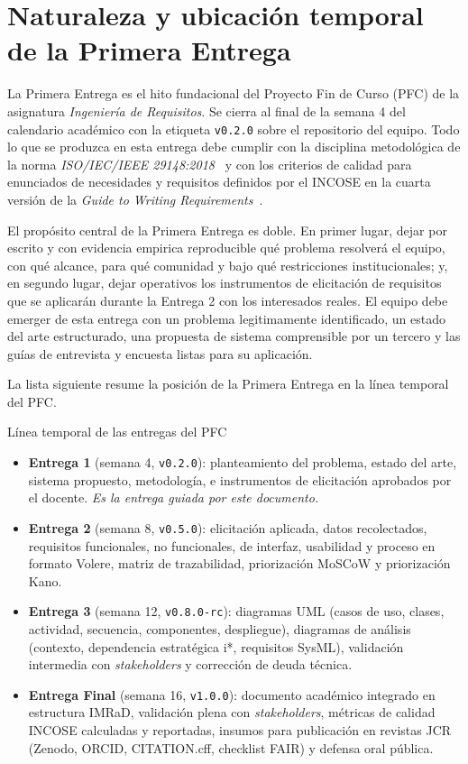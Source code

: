 \documentclass[11pt,a4paper]{article}
\begin{document}
\section{Naturaleza y ubicaci\'on temporal de la Primera Entrega}

La Primera Entrega es el hito fundacional del Proyecto Fin de Curso (PFC) de la asignatura \emph{Ingenier\'ia de Requisitos}. Se cierra al final de la semana 4 del calendario acad\'emico con la etiqueta \texttt{v0.2.0} sobre el repositorio del equipo. Todo lo que se produzca en esta entrega debe cumplir con la disciplina metodol\'ogica de la norma \emph{ISO/IEC/IEEE 29148:2018}~\cite{iso29148} y con los criterios de calidad para enunciados de necesidades y requisitos definidos por el INCOSE en la cuarta versi\'on de la \emph{Guide to Writing Requirements}~\cite{incose2023requirements}.

El prop\'osito central de la Primera Entrega es doble. En primer lugar, dejar por escrito y con evidencia empirica reproducible qu\'e problema resolver\'a el equipo, con qu\'e alcance, para qu\'e comunidad y bajo qu\'e restricciones institucionales; y, en segundo lugar, dejar operativos los instrumentos de elicitaci\'on de requisitos que se aplicar\'an durante la Entrega 2 con los interesados reales. El equipo debe emerger de esta entrega con un problema legitimamente identificado, un estado del arte estructurado, una propuesta de sistema comprensible por un tercero y las gu\'ias de entrevista y encuesta listas para su aplicaci\'on.

La lista siguiente resume la posici\'on de la Primera Entrega en la l\'inea temporal del PFC.

\begin{cajadefinicion}{L\'inea temporal de las entregas del PFC}
    \begin{itemize}
        \item \textbf{Entrega 1} (semana 4, \texttt{v0.2.0}): planteamiento del problema, estado del arte, sistema propuesto, metodolog\'ia, e instrumentos de elicitaci\'on aprobados por el docente. \emph{Es la entrega guiada por este documento.}
        \item \textbf{Entrega 2} (semana 8, \texttt{v0.5.0}): elicitaci\'on aplicada, datos recolectados, requisitos funcionales, no funcionales, de interfaz, usabilidad y proceso en formato Volere, matriz de trazabilidad, priorizaci\'on MoSCoW y priorizaci\'on Kano.
        \item \textbf{Entrega 3} (semana 12, \texttt{v0.8.0-rc}): diagramas UML (casos de uso, clases, actividad, secuencia, componentes, despliegue), diagramas de an\'alisis (contexto, dependencia estrat\'egica i*, requisitos SysML), validaci\'on intermedia con \emph{stakeholders} y correcci\'on de deuda t\'ecnica.
        \item \textbf{Entrega Final} (semana 16, \texttt{v1.0.0}): documento acad\'emico integrado en estructura IMRaD, validaci\'on plena con \emph{stakeholders}, m\'etricas de calidad INCOSE calculadas y reportadas, insumos para publicaci\'on en revistas JCR (Zenodo, ORCID, CITATION.cff, checklist FAIR) y defensa oral p\'ublica.
    \end{itemize}
\end{cajadefinicion}
\end{document}
